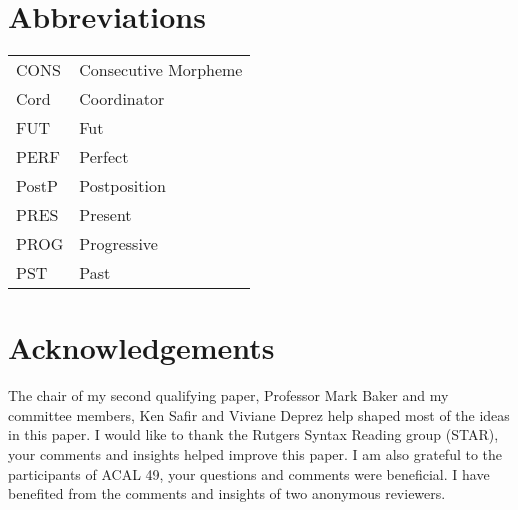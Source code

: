 \documentclass[output=paper,colorlinks,citecolor=brown]{langscibook}
\begin{document}
\section*{Abbreviations}

\begin{tabular}{@{}ll@{}} 
CONS  & Consecutive Morpheme  \\
Cord  & Coordinator \\
FUT   & Fut \\
PERF  & Perfect \\
PostP & Postposition  \\
PRES  & Present  \\
PROG  & Progressive \\
PST   & Past \\
\end{tabular}


\section*{Acknowledgements}
The chair of my second qualifying paper, Professor Mark Baker and my committee members, Ken Safir and Viviane Deprez help shaped most of the ideas in this paper. I would like to thank the Rutgers Syntax Reading group (STAR), your comments and insights helped improve this paper. I am also grateful to the participants of ACAL 49, your questions and comments were beneficial. I have benefited from the comments and insights of two anonymous reviewers.

{\sloppy\printbibliography[heading=subbibliography,notkeyword=this]}
\end{document}
